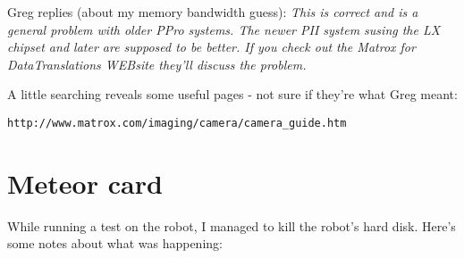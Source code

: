 \begin{itemize}
Greg replies (about my memory bandwidth guess):
{\it
This is correct and is a general problem with older PPro systems.  The
newer PII system susing the LX chipset and later are supposed to be
better.  If you check out the Matrox for DataTranslations WEBsite
they'll discuss the problem.
}

A little searching reveals some useful pages - not sure if they're what 
Greg meant:
\begin{verbatim}
http://www.matrox.com/imaging/camera/camera_guide.htm
\end{verbatim}

\end{itemize}

\section{Meteor card}

While running a test on the robot, I managed to kill the robot's
hard disk.  Here's some notes about what was happening:

